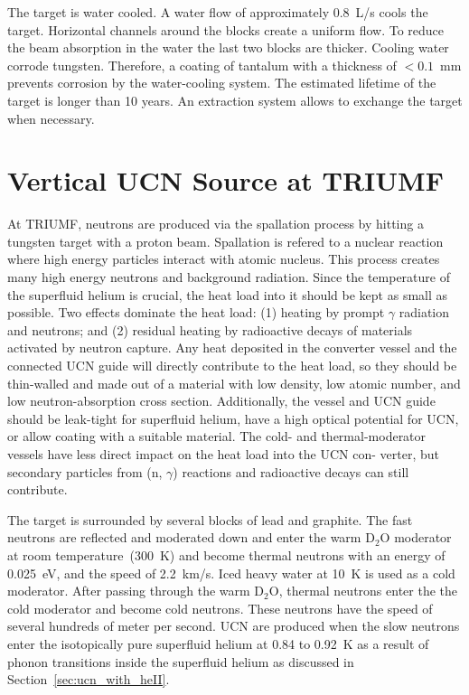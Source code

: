 The target is water cooled. A water flow of approximately
0.8~L/s cools the target. Horizontal channels around the blocks create
a uniform flow. To reduce the beam absorption in the water the last
two blocks are thicker. Cooling water corrode tungsten.  Therefore, a
coating of tantalum with a thickness of $< 0.1$~mm prevents corrosion
by the water-cooling system. The estimated lifetime of the target is
longer than 10 years. An extraction system allows to exchange the
target when necessary.


\section{Vertical UCN Source at TRIUMF\label{sec:vertical_source}}
At TRIUMF, neutrons are produced via the spallation process by hitting
a tungsten target with a proton beam. Spallation is refered to a
nuclear reaction where high energy particles interact with atomic
nucleus. This process creates many high energy neutrons and background
radiation.  Since the temperature of the superfluid helium is crucial,
the heat load into it should be kept as small as possible. Two effects
dominate the heat load: (1) heating by prompt $\gamma$ radiation and
neutrons; and (2) residual heating by radioactive decays of materials
activated by neutron capture.  Any heat deposited in the converter
vessel and the connected UCN guide will directly contribute to the
heat load, so they should be thin-walled and made out of a material
with low density, low atomic number, and low neutron-absorption cross
section. Additionally, the vessel and UCN guide should be leak-tight
for superfluid helium, have a high optical potential for UCN, or allow
coating with a suitable material. The cold- and thermal-moderator
vessels have less direct impact on the heat load into the UCN con-
verter, but secondary particles from (n, $\gamma$) reactions and
radioactive decays can still contribute.




The target is surrounded by several blocks of lead and
graphite. The fast neutrons are reflected and moderated down and enter
the warm D$_2$O moderator at room temperature~(300~K) and become
thermal neutrons with an energy of 0.025~eV, and the speed of 2.2~km/s.
Iced heavy water at 10~K is used as a cold moderator. After passing
through the warm D$_2$O, thermal neutrons enter the the cold moderator
and become cold neutrons. These neutrons have the speed of several
hundreds of meter per second.  UCN are produced when the slow neutrons
enter the isotopically pure superfluid helium at 0.84 to 0.92~K as a
result of phonon transitions inside the superfluid helium as discussed
in Section~\ref{sec:ucn_with_heII}.


